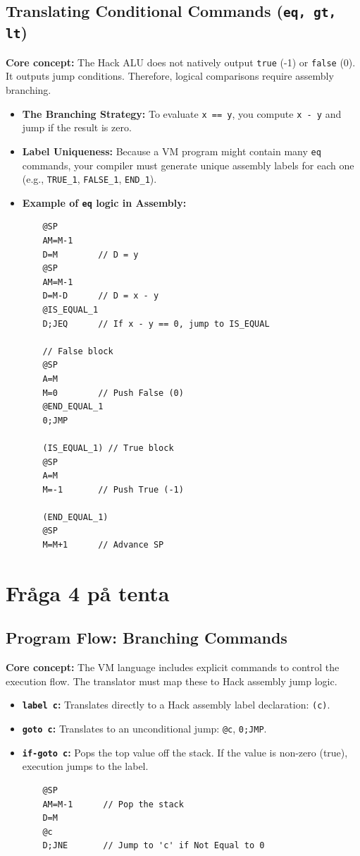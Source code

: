 \documentclass[12pt,a4paper]{article}
\begin{document}
\subsection{Translating Conditional Commands (\texttt{eq, gt, lt})}
\textbf{Core concept:} The Hack ALU does not natively output \texttt{true} (-1) or \texttt{false} (0). It outputs jump conditions. Therefore, logical comparisons require assembly branching.
\begin{itemize}
    \item \textbf{The Branching Strategy:} To evaluate \texttt{x == y}, you compute \texttt{x - y} and jump if the result is zero.
    \item \textbf{Label Uniqueness:} Because a VM program might contain many \texttt{eq} commands, your compiler must generate unique assembly labels for each one (e.g., \texttt{TRUE\_1}, \texttt{FALSE\_1}, \texttt{END\_1}).
    \item \textbf{Example of \texttt{eq} logic in Assembly:}
    \begin{verbatim}
    @SP
    AM=M-1
    D=M        // D = y
    @SP
    AM=M-1
    D=M-D      // D = x - y
    @IS_EQUAL_1
    D;JEQ      // If x - y == 0, jump to IS_EQUAL
    
    // False block
    @SP
    A=M
    M=0        // Push False (0)
    @END_EQUAL_1
    0;JMP
    
    (IS_EQUAL_1) // True block
    @SP
    A=M
    M=-1       // Push True (-1)
    
    (END_EQUAL_1)
    @SP
    M=M+1      // Advance SP
    \end{verbatim}
\end{itemize}

\newpage
\section{Fråga 4 på tenta}
\subsection{Program Flow: Branching Commands}
\textbf{Core concept:} The VM language includes explicit commands to control the execution flow. The translator must map these to Hack assembly jump logic.
\begin{itemize}
    \item \textbf{\texttt{label c}:} Translates directly to a Hack assembly label declaration: \texttt{(c)}.
    \item \textbf{\texttt{goto c}:} Translates to an unconditional jump: \texttt{@c}, \texttt{0;JMP}.
    \item \textbf{\texttt{if-goto c}:} Pops the top value off the stack. If the value is non-zero (true), execution jumps to the label.
    \begin{verbatim}
    @SP
    AM=M-1      // Pop the stack
    D=M
    @c
    D;JNE       // Jump to 'c' if Not Equal to 0
    \end{verbatim}
\end{itemize}
\end{document}
